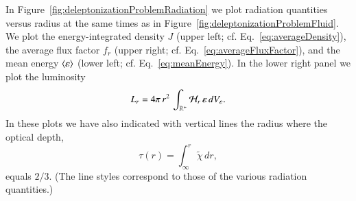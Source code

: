 \documentclass[11pt,letterpaper,twoside,english,final]{article}
\begin{document}
In Figure~\ref{fig:deleptonizationProblemRadiation} we plot radiation quantities versus radius at the same times as in Figure~\ref{fig:deleptonizationProblemFluid}.  
We plot the energy-integrated density $J$ (upper left; cf. Eq.~\eqref{eq:averageDensity}), the average flux factor $f_{r}$ (upper right; cf. Eq.~\eqref{eq:averageFluxFactor}), and the mean energy $\langle\varepsilon\rangle$ (lower left; cf. Eq.~\eqref{eq:meanEnergy}).  
In the lower right panel we plot the luminosity
\begin{equation}
  L_{r}=4\pi\,r^{2}\,\int_{\mathbb{R}^{+}}\mathcal{H}_{r}\,\varepsilon\,dV_{\varepsilon}.  
\end{equation}
In these plots we have also indicated with vertical lines the radius where the optical depth,
\begin{equation}
  \tau(r)=\int_{\infty}^{r}\tilde{\chi}\,dr,
\end{equation}
equals $2/3$.  
(The line styles correspond to those of the various radiation quantities.)
\end{document}
